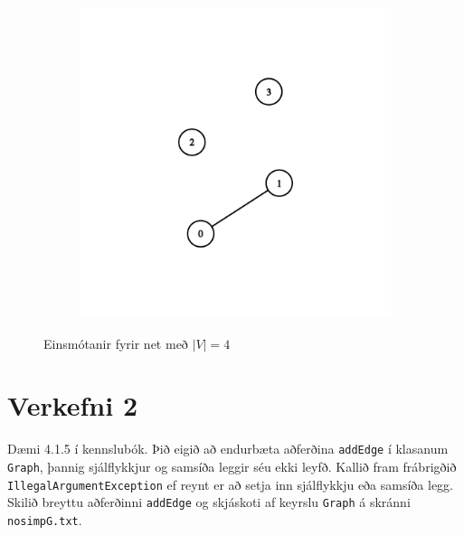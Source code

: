 \documentclass[12pt, a4paper, hidelinks]{article}
\begin{document}
\begin{figure}[H]
    \centering
    \begin{subfigure}[b]{0.45\textwidth}
        \includegraphics[width=\textwidth]{graph_v4_11.png}
    \end{subfigure}
    \caption{Einsmótanir fyrir net með $|V| = 4$}
\end{figure}

\newpage

\section*{Verkefni 2}
Dæmi 4.1.5 í kennslubók. Þið eigið að endurbæta aðferðina \texttt{addEdge} í klasanum \texttt{Graph}, þannig sjálflykkjur og samsíða leggir séu ekki leyfð. Kallið fram frábrigðið \texttt{IllegalArgumentException} ef reynt er að setja inn sjálflykkju eða samsíða legg. Skilið breyttu aðferðinni \texttt{addEdge} og skjáskoti af keyrslu \texttt{Graph} á skránni \texttt{nosimpG.txt}.
\end{document}
